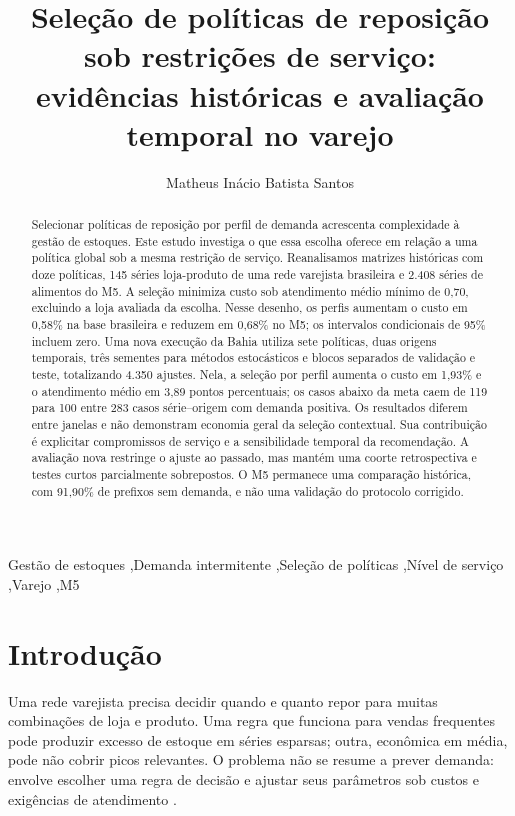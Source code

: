 \documentclass[preprint,12pt]{elsarticle}
\begin{document}
\begin{frontmatter}
\title{Seleção de políticas de reposição sob restrições de serviço: evidências históricas e avaliação temporal no varejo}
\author[ufal]{Matheus Inácio Batista Santos}
\begin{abstract}
Selecionar políticas de reposição por perfil de demanda acrescenta complexidade à gestão de estoques. Este estudo investiga o que essa escolha oferece em relação a uma política global sob a mesma restrição de serviço. Reanalisamos matrizes históricas com doze políticas, 145 séries loja-produto de uma rede varejista brasileira e 2.408 séries de alimentos do M5. A seleção minimiza custo sob atendimento médio mínimo de 0,70, excluindo a loja avaliada da escolha. Nesse desenho, os perfis aumentam o custo em 0,58\% na base brasileira e reduzem em 0,68\% no M5; os intervalos condicionais de 95\% incluem zero. Uma nova execução da Bahia utiliza sete políticas, duas origens temporais, três sementes para métodos estocásticos e blocos separados de validação e teste, totalizando 4.350 ajustes. Nela, a seleção por perfil aumenta o custo em 1,93\% e o atendimento médio em 3,89 pontos percentuais; os casos abaixo da meta caem de 119 para 100 entre 283 casos série--origem com demanda positiva. Os resultados diferem entre janelas e não demonstram economia geral da seleção contextual. Sua contribuição é explicitar compromissos de serviço e a sensibilidade temporal da recomendação. A avaliação nova restringe o ajuste ao passado, mas mantém uma coorte retrospectiva e testes curtos parcialmente sobrepostos. O M5 permanece uma comparação histórica, com 91,90\% de prefixos sem demanda, e não uma validação do protocolo corrigido.
\end{abstract}
\begin{keyword}
Gestão de estoques \sep Demanda intermitente \sep Seleção de políticas \sep Nível de serviço \sep Varejo \sep M5
\end{keyword}
\end{frontmatter}

\section{Introdução}
Uma rede varejista precisa decidir quando e quanto repor para muitas combinações de loja e produto. Uma regra que funciona para vendas frequentes pode produzir excesso de estoque em séries esparsas; outra, econômica em média, pode não cobrir picos relevantes. O problema não se resume a prever demanda: envolve escolher uma regra de decisão e ajustar seus parâmetros sob custos e exigências de atendimento \cite{Axsater2006InventoryControl}.
\end{document}
